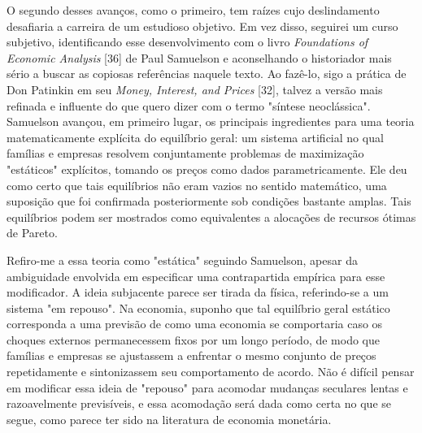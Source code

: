 \documentclass[12pt]{article}
\begin{document}
O segundo desses avanços, como o primeiro, tem raízes cujo deslindamento desafiaria a carreira de um estudioso objetivo. Em vez disso, seguirei um curso subjetivo, identificando esse desenvolvimento com o livro \textit{Foundations of Economic Analysis} [36] de Paul Samuelson e aconselhando o historiador mais sério a buscar as copiosas referências naquele texto. Ao fazê-lo, sigo a prática de Don Patinkin em seu \textit{Money, Interest, and Prices} [32], talvez a versão mais refinada e influente do que quero dizer com o termo "síntese neoclássica". Samuelson avançou, em primeiro lugar, os principais ingredientes para uma teoria matematicamente explícita do equilíbrio geral: um sistema artificial no qual famílias e empresas resolvem conjuntamente problemas de maximização "estáticos" explícitos, tomando os preços como dados parametricamente. Ele deu como certo que tais equilíbrios não eram vazios no sentido matemático, uma suposição que foi confirmada posteriormente sob condições bastante amplas. Tais equilíbrios podem ser mostrados como equivalentes a alocações de recursos ótimas de Pareto.

Refiro-me a essa teoria como "estática" seguindo Samuelson, apesar da ambiguidade envolvida em especificar uma contrapartida empírica para esse modificador. A ideia subjacente parece ser tirada da física, referindo-se a um sistema "em repouso". Na economia, suponho que tal equilíbrio geral estático corresponda a uma previsão de como uma economia se comportaria caso os choques externos permanecessem fixos por um longo período, de modo que famílias e empresas se ajustassem a enfrentar o mesmo conjunto de preços repetidamente e sintonizassem seu comportamento de acordo. Não é difícil pensar em modificar essa ideia de "repouso" para acomodar mudanças seculares lentas e razoavelmente previsíveis, e essa acomodação será dada como certa no que se segue, como parece ter sido na literatura de economia monetária.
\end{document}
